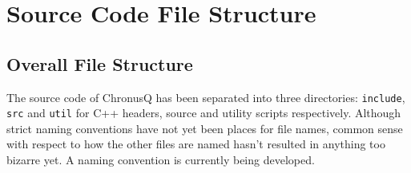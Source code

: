 \documentclass[12pt]{article}
\begin{document}
\section{Source Code File Structure}
\subsection{Overall File Structure}
The source code of ChronusQ has been separated into three directories: \texttt{include}, \texttt{src} and \texttt{util} for C++ headers, source and utility scripts respectively. Although strict naming conventions have not yet been places for file names, common sense with respect to how the other files are named hasn't resulted in anything too bizarre yet. A naming convention is currently being developed.
\end{document}
